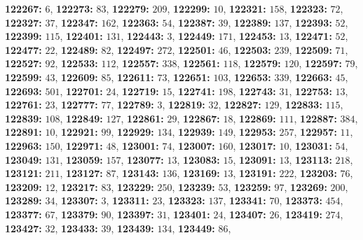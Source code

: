 \textsf{\bfseries 122267:} $6$, \textsf{\bfseries 122273:} $83$, \textsf{\bfseries 122279:} $209$, \textsf{\bfseries 122299:} $10$, \textsf{\bfseries 122321:} $158$, \textsf{\bfseries 122323:} $72$, \textsf{\bfseries 122327:} $37$, \textsf{\bfseries 122347:} $162$, \textsf{\bfseries 122363:} $54$, \textsf{\bfseries 122387:} $39$, \textsf{\bfseries 122389:} $137$, \textsf{\bfseries 122393:} $52$, \textsf{\bfseries 122399:} $115$, \textsf{\bfseries 122401:} $131$, \textsf{\bfseries 122443:} $3$, \textsf{\bfseries 122449:} $171$, \textsf{\bfseries 122453:} $13$, \textsf{\bfseries 122471:} $52$, \textsf{\bfseries 122477:} $22$, \textsf{\bfseries 122489:} $82$, \textsf{\bfseries 122497:} $272$, \textsf{\bfseries 122501:} $46$, \textsf{\bfseries 122503:} $239$, \textsf{\bfseries 122509:} $71$, \textsf{\bfseries 122527:} $92$, \textsf{\bfseries 122533:} $112$, \textsf{\bfseries 122557:} $338$, \textsf{\bfseries 122561:} $118$, \textsf{\bfseries 122579:} $120$, \textsf{\bfseries 122597:} $79$, \textsf{\bfseries 122599:} $43$, \textsf{\bfseries 122609:} $85$, \textsf{\bfseries 122611:} $73$, \textsf{\bfseries 122651:} $103$, \textsf{\bfseries 122653:} $339$, \textsf{\bfseries 122663:} $45$, \textsf{\bfseries 122693:} $501$, \textsf{\bfseries 122701:} $24$, \textsf{\bfseries 122719:} $15$, \textsf{\bfseries 122741:} $198$, \textsf{\bfseries 122743:} $31$, \textsf{\bfseries 122753:} $13$, \textsf{\bfseries 122761:} $23$, \textsf{\bfseries 122777:} $77$, \textsf{\bfseries 122789:} $3$, \textsf{\bfseries 122819:} $32$, \textsf{\bfseries 122827:} $129$, \textsf{\bfseries 122833:} $115$, \textsf{\bfseries 122839:} $108$, \textsf{\bfseries 122849:} $127$, \textsf{\bfseries 122861:} $29$, \textsf{\bfseries 122867:} $18$, \textsf{\bfseries 122869:} $111$, \textsf{\bfseries 122887:} $384$, \textsf{\bfseries 122891:} $10$, \textsf{\bfseries 122921:} $99$, \textsf{\bfseries 122929:} $134$, \textsf{\bfseries 122939:} $149$, \textsf{\bfseries 122953:} $257$, \textsf{\bfseries 122957:} $11$, \textsf{\bfseries 122963:} $150$, \textsf{\bfseries 122971:} $48$, \textsf{\bfseries 123001:} $74$, \textsf{\bfseries 123007:} $160$, \textsf{\bfseries 123017:} $10$, \textsf{\bfseries 123031:} $54$, \textsf{\bfseries 123049:} $131$, \textsf{\bfseries 123059:} $157$, \textsf{\bfseries 123077:} $13$, \textsf{\bfseries 123083:} $15$, \textsf{\bfseries 123091:} $13$, \textsf{\bfseries 123113:} $218$, \textsf{\bfseries 123121:} $211$, \textsf{\bfseries 123127:} $87$, \textsf{\bfseries 123143:} $136$, \textsf{\bfseries 123169:} $13$, \textsf{\bfseries 123191:} $222$, \textsf{\bfseries 123203:} $76$, \textsf{\bfseries 123209:} $12$, \textsf{\bfseries 123217:} $83$, \textsf{\bfseries 123229:} $250$, \textsf{\bfseries 123239:} $53$, \textsf{\bfseries 123259:} $97$, \textsf{\bfseries 123269:} $200$, \textsf{\bfseries 123289:} $34$, \textsf{\bfseries 123307:} $3$, \textsf{\bfseries 123311:} $23$, \textsf{\bfseries 123323:} $137$, \textsf{\bfseries 123341:} $70$, \textsf{\bfseries 123373:} $454$, \textsf{\bfseries 123377:} $67$, \textsf{\bfseries 123379:} $90$, \textsf{\bfseries 123397:} $31$, \textsf{\bfseries 123401:} $24$, \textsf{\bfseries 123407:} $26$, \textsf{\bfseries 123419:} $274$, \textsf{\bfseries 123427:} $32$, \textsf{\bfseries 123433:} $39$, \textsf{\bfseries 123439:} $134$, \textsf{\bfseries 123449:} $86$, 
